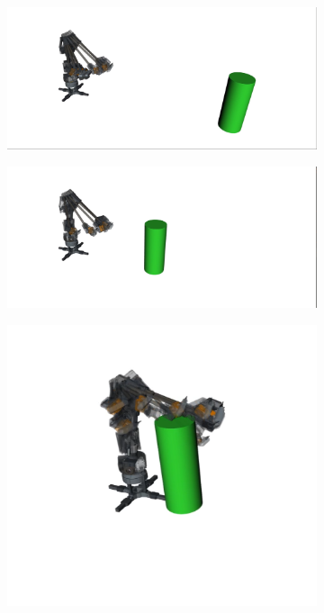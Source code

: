 \begin{figure}
  \centering
  \captionsetup{justification=centering}
  \begin{subfigure}[b]{0.4\linewidth}
    \label{subfig:top_view}
    \includegraphics[width=\linewidth]{avoiding_moving_obs_1.png}
     \caption{}
  \end{subfigure}
  \begin{subfigure}[b]{0.4\linewidth}
    \includegraphics[width=\linewidth]{avoiding_moving_obs_2.png}
    \caption{}
  \end{subfigure}
  \begin{subfigure}[b]{0.4\linewidth}
    \includegraphics[width=\linewidth]{avoiding_moving_obs_3.png}

\end{subfigure}
\end{figure}
